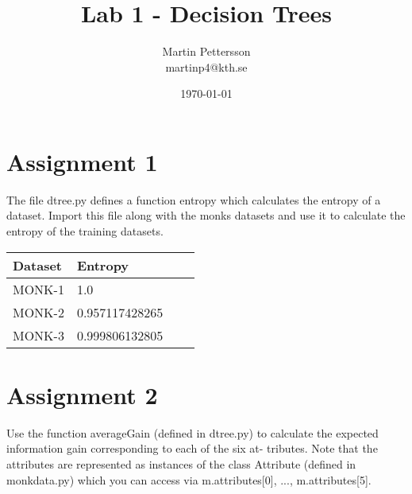 \documentclass[a4paper]{article}
\begin{document}
 

\title{Lab 1 - Decision Trees}

\author{Martin Pettersson\\martinp4@kth.se}

\date{\today}

\maketitle

\section{Assignment 1}

The file dtree.py defines a function entropy which calculates the entropy of a dataset. Import this file along with the monks datasets and use it to calculate the entropy of the training datasets.

\begin{center}
    \begin{tabular}{ | l | l | l | p{5cm} |}
    \hline
    Dataset & Entropy \\ \hline
    MONK-1 & 1.0 \\
    MONK-2 & 0.957117428265 \\
    MONK-3 & 0.999806132805 \\
    \hline
    \end{tabular}
\end{center}

\section{Assignment 2}

Use the function averageGain (defined in dtree.py) to calculate the expected information gain corresponding to each of the six at- tributes. Note that the attributes are represented as instances of the class Attribute (defined in monkdata.py) which you can access via m.attributes[0], ..., m.attributes[5]. \\
\end{document}
